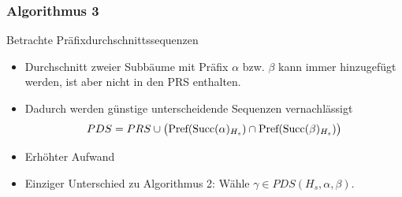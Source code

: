 \begin{frame}
  \frametitle{Algorithmus 3}
  Betrachte Präfixdurchschnittssequenzen
  \begin{itemize}
    \item Durchschnitt zweier Subbäume mit Präfix $\alpha$ bzw. $\beta$ kann immer hinzugefügt werden, ist aber nicht in den PRS enthalten.
    \item Dadurch werden günstige unterscheidende Sequenzen vernachlässigt
    $$PDS = PRS \cup \big( \text{\rm Pref}(\text{\rm Succ}(\alpha)_{H_s}) \cap \text{\rm Pref}(\text{\rm Succ}(\beta)_{H_s}) \big) $$
    \item Erhöhter Aufwand
    \item Einziger Unterschied zu Algorithmus 2: Wähle $\gamma \in PDS(H_s,\alpha,\beta)$.
  \end{itemize}
\end{frame}